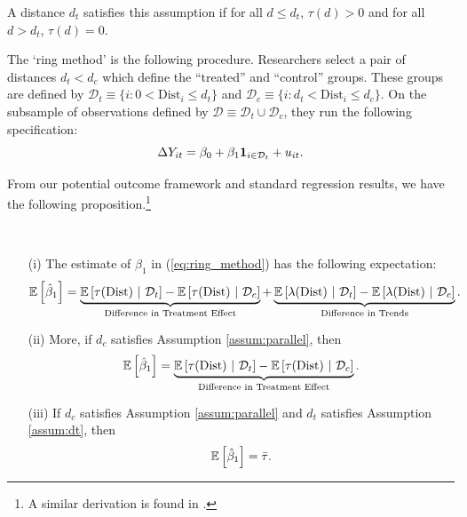 \documentclass[10pt]{article}
\newcommand{\dist}{\text{Dist}}
\begin{document}
\begin{assumption}[Correct $d_t$]\label{assum:dt}
    A distance $d_t$ satisfies this assumption if for all $d \leq d_t$, $\tau(d) > 0$ and for all $d > d_t$, $\tau(d) = 0$. 
\end{assumption}


The `ring method' is the following procedure. Researchers select a pair of distances $d_t < d_c$ which define the ``treated'' and ``control'' groups. These groups are defined by $\mathcal{D}_t \equiv \{ i : 0 < \dist_i \leq d_t \}$ and $\mathcal{D}_c \equiv \{ i : d_t < \dist_i \leq d_c \}$. On the subsample of observations defined by $\mathcal{D} \equiv \mathcal{D}_t \cup \mathcal{D}_c$, they run the following specification:
\begin{equation}\label{eq:ring_method}
    \Delta Y_{it} = \beta_0 + \beta_1 \mathbf{1}_{i \in \mathcal{D}_t} + u_{it}.
\end{equation}

From our potential outcome framework and standard regression results, we have the following proposition.\footnote{A similar derivation is found in \citet{Sullivan_2017}.}

\begin{proposition}\label{prop:ring_decomp}     
    \par~\par
    \begin{enumerate}
        \item[(i)] The estimate of $\beta_1$ in (\ref{eq:ring_method}) has the following expectation:
        \[
            \expec{\hat{\beta}_1} = 
            \underbrace{\condexpec{\tau(\dist)}{\mathcal{D}_t} - \condexpec{\tau(\dist)}{\mathcal{D}_c} }_{\text{Difference in Treatment Effect}} 
            + \underbrace{\condexpec{\lambda(\dist)}{\mathcal{D}_t} - \condexpec{\lambda(\dist)}{\mathcal{D}_c} }_{\text{Difference in Trends}}.
        \]
        
        \item[(ii)] More, if $d_c$ satisfies Assumption \ref{assum:parallel}, then
        \[ 
            \expec{\hat{\beta}_1} = 
            \underbrace{\condexpec{\tau(\dist)}{\mathcal{D}_t} - \condexpec{\tau(\dist)}{\mathcal{D}_c} }_{\text{Difference in Treatment Effect}}.
        \] 
    
        \item[(iii)] If $d_c$ satisfies Assumption \ref{assum:parallel} and $d_t$ satisfies Assumption \ref{assum:dt}, then
        \[ 
            \mathbb{E}\left[\hat{\beta}_1\right] = \bar{\tau}.
        \]
    \end{enumerate}
    
    
\end{proposition}
\end{document}
